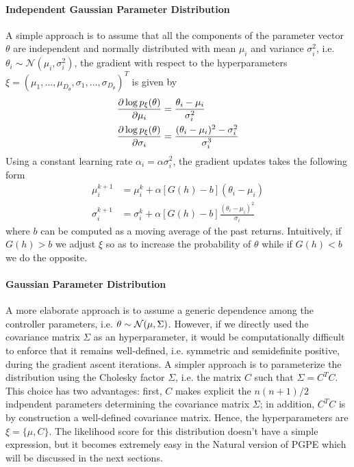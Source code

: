 \paragraph{Independent Gaussian Parameter Distribution}
A simple approach is to assume that all the components of the parameter vector
$\theta$ are independent and normally distributed with mean $\mu_i$ and
variance $\sigma_i^2$, i.e. $\theta_i \sim \mathcal{N}(\mu_i, \sigma_i^2)$, the
gradient with respect to the hyperparameters $\xi = (\mu_1, \ldots, 
\mu_{D_\theta}, \sigma_1, \ldots, \sigma_{D_\theta})^T$ is given by 
\begin{equation}
	\begin{split}
		\frac{\partial \log p_\xi(\theta)}{\partial \mu_i} &= \frac{\theta_i -
		\mu_i}{\sigma_i^2}\\	
		\frac{\partial \log p_\xi(\theta)}{\partial \sigma_i} &= \frac{(\theta_i - \mu_i)^2 -
		\sigma_i^2}{\sigma_i^3}
	\end{split}
\end{equation}
Using a constant learning rate $\alpha_i = \alpha \sigma_i^2$, the gradient
updates takes the following form
\begin{equation}
	\begin{split}
		\mu_i^{k+1} &= \mu_i^k + \alpha \left[G(h) - b\right] (\theta_i - \mu_i)\\
		\sigma_i^{k+1} &= \sigma_i^k + \alpha \left[G(h) - b\right] 
		\frac{(\theta_i -\mu_i)^2}{\sigma_i}
	\end{split}
\end{equation}
where $b$ can be computed as a moving average of the past returns. Intuitively,
if $G(h) > b$ we adjust $\xi$ so as to increase the probability of $\theta$
while if $G(h) < b$ we do the opposite. 

\paragraph{Gaussian Parameter Distribution}
A more elaborate approach is to assume a generic dependence among the controller parameters, i.e. $\theta \sim \mathcal{N}(\mu, \Sigma)$. However, if we directly used the covariance matrix $\Sigma$ as an hyperparameter, it would be computationally difficult to enforce that it remains well-defined, i.e. symmetric and semidefinite positive, during the gradient ascent iterations. A simpler approach is to parameterize the distribution using the Cholesky factor $\Sigma$, i.e. the matrix $C$ such that $\Sigma = C^T C$. This choice has two advantages: first, $C$ makes explicit the $n(n+1)/2$ indpendent parameters determining the covariance matrix $\Sigma$; in addition, $C^T C$ is by construction a well-defined covariance matrix. Hence, the hyperparameters are $\xi =\{\mu, C\}$. The likelihood score for this distribution doesn't have a simple expression, but it becomes extremely easy in the Natural version of PGPE which will be discussed in the next sections.

